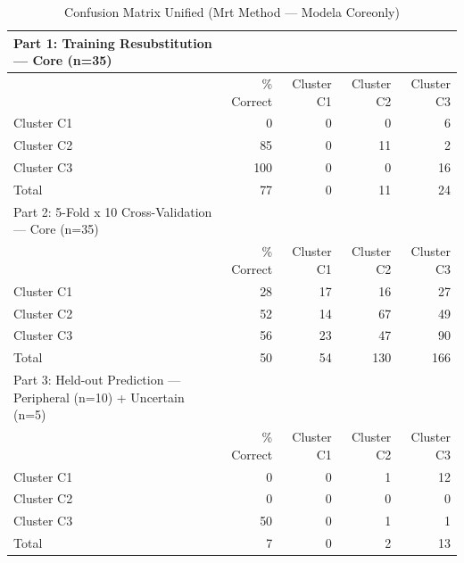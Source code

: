 \begin{table}[htbp]
  \centering
  \caption{Confusion Matrix Unified (Mrt Method — Modela Coreonly)}
  \label{tab:MRT_Method_ModelA_CoreOnly_tables_confusion_matrix_unified}
  \begin{tabular}{lrrrr}
    \toprule
    Part 1: Training Resubstitution — Core (n=35) &  &  &  &  \\
    \midrule
     & \% Correct & Cluster C1 & Cluster C2 & Cluster C3 \\
    Cluster C1 & 0 & 0 & 0 & 6 \\
    Cluster C2 & 85 & 0 & 11 & 2 \\
    Cluster C3 & 100 & 0 & 0 & 16 \\
    Total & 77 & 0 & 11 & 24 \\
    Part 2: 5-Fold x 10 Cross-Validation — Core (n=35) &  &  &  &  \\
     & \% Correct & Cluster C1 & Cluster C2 & Cluster C3 \\
    Cluster C1 & 28 & 17 & 16 & 27 \\
    Cluster C2 & 52 & 14 & 67 & 49 \\
    Cluster C3 & 56 & 23 & 47 & 90 \\
    Total & 50 & 54 & 130 & 166 \\
    Part 3: Held-out Prediction — Peripheral (n=10) + Uncertain (n=5) &  &  &  &  \\
     & \% Correct & Cluster C1 & Cluster C2 & Cluster C3 \\
    Cluster C1 & 0 & 0 & 1 & 12 \\
    Cluster C2 & 0 & 0 & 0 & 0 \\
    Cluster C3 & 50 & 0 & 1 & 1 \\
    Total & 7 & 0 & 2 & 13 \\
    \bottomrule
  \end{tabular}
\end{table}
